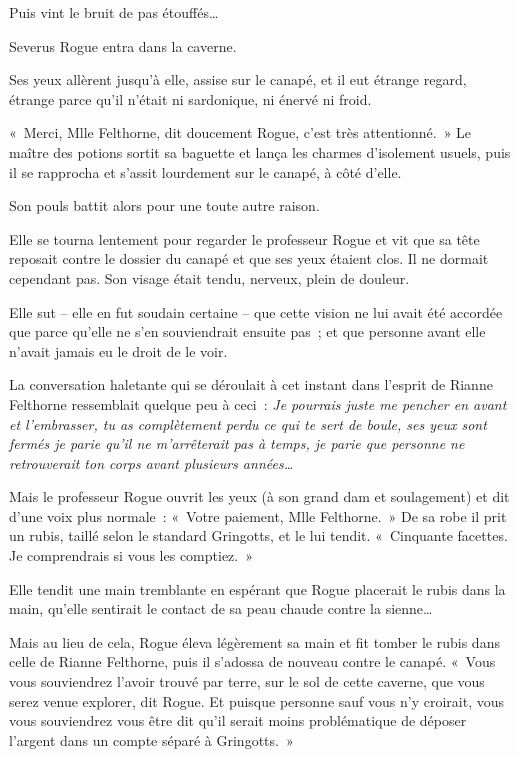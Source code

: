 Puis vint le bruit de pas étouffés…

Severus Rogue entra dans la caverne.

Ses yeux allèrent jusqu'à elle, assise sur le canapé, et il eut étrange regard, étrange parce qu'il n'était ni sardonique, ni énervé ni froid.

«~Merci, Mlle Felthorne, dit doucement Rogue, c'est très attentionné.~» Le maître des potions sortit sa baguette et lança les charmes d'isolement usuels, puis il se rapprocha et s'assit lourdement sur le canapé, à côté d'elle.

Son pouls battit alors pour une toute autre raison.

Elle se tourna lentement pour regarder le professeur Rogue et vit que sa tête reposait contre le dossier du canapé et que ses yeux étaient clos. Il ne dormait cependant pas. Son visage était tendu, nerveux, plein de douleur.

Elle sut -- elle en fut soudain certaine -- que cette vision ne lui avait été accordée que parce qu'elle ne s'en souviendrait ensuite pas~; et que personne avant elle n'avait jamais eu le droit de le voir.

La conversation haletante qui se déroulait à cet instant dans l'esprit de Rianne Felthorne ressemblait quelque peu à ceci~: \emph{Je pourrais juste me pencher en avant et l'embrasser, tu as complètement perdu ce qui te sert de boule, ses yeux sont fermés je parie qu'il ne m'arrêterait pas à temps, je parie que personne ne retrouverait ton corps avant plusieurs années…}

Mais le professeur Rogue ouvrit les yeux (à son grand dam et soulagement) et dit d'une voix plus normale~: «~Votre paiement, Mlle Felthorne.~» De sa robe il prit un rubis, taillé selon le standard Gringotts, et le lui tendit. «~Cinquante facettes. Je comprendrais si vous les comptiez.~»

Elle tendit une main tremblante en espérant que Rogue placerait le rubis dans la main, qu'elle sentirait le contact de sa peau chaude contre la sienne…

Mais au lieu de cela, Rogue éleva légèrement sa main et fit tomber le rubis dans celle de Rianne Felthorne, puis il s'adossa de nouveau contre le canapé. «~Vous vous souviendrez l'avoir trouvé par terre, sur le sol de cette caverne, que vous serez venue explorer, dit Rogue. Et puisque personne sauf vous n'y croirait, vous vous souviendrez vous être dit qu'il serait moins problématique de déposer l'argent dans un compte séparé à Gringotts.~»

